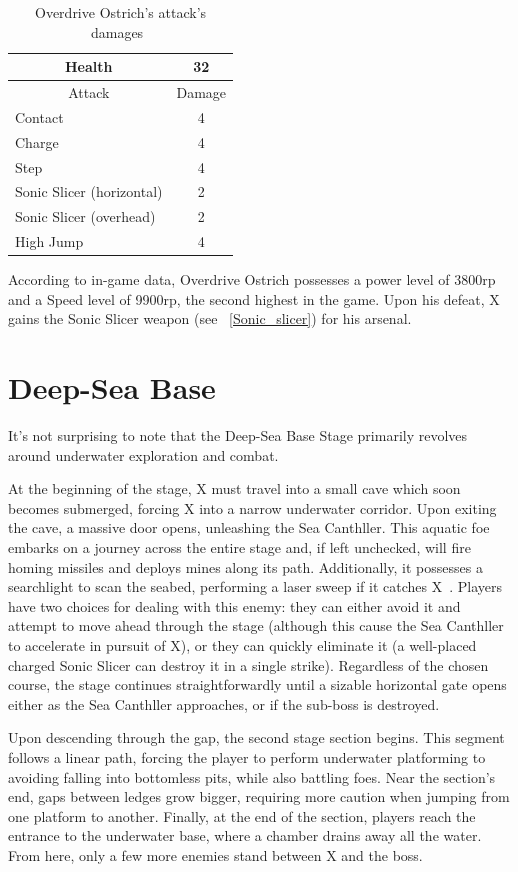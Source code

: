 \begin{table}[htp]
	\centering
	\begin{tabular}[h]{l c}
		\toprule
		\multicolumn{1}{c}{Health}  & 32 \\
		\midrule
		\multicolumn{1}{c}{Attack} & \multicolumn{1}{c}{Damage}\\
		Contact & 4 \\
		Charge & 4\\
		Step& 4\\
		Sonic Slicer (horizontal) & 2\\
		Sonic Slicer (overhead) & 2\\
		High Jump & 4\\
		\bottomrule
	\end{tabular}
	\caption{Overdrive Ostrich's attack's damages~\cite{wiki:Overdrive_Ostrich,book:Compendium}}
\end{table}
According to in-game data, Overdrive Ostrich possesses a power level of 3800rp and a Speed level of 9900rp, the second highest in the game. Upon his defeat, X gains the Sonic Slicer weapon (see ~\ref{Sonic_slicer}) for his arsenal.

\section{Deep-Sea Base}
It's not surprising to note that the Deep-Sea Base Stage primarily revolves around underwater exploration and combat.

At the beginning of the stage, X must travel into a small cave which soon becomes submerged, forcing X into a narrow underwater corridor. Upon exiting the cave, a massive door opens, unleashing the Sea Canthller. This aquatic foe embarks on a journey across the entire stage and, if left unchecked, will fire homing missiles and deploys mines along its path. Additionally, it possesses a searchlight to scan the seabed, performing a laser sweep if it catches X~\cite{wiki:Sea_Canthller}. Players have two choices for dealing with this enemy: they can either avoid it and attempt to move ahead through the stage (although this cause the Sea Canthller to accelerate in pursuit of X), or they can quickly eliminate it (a well-placed charged Sonic Slicer can destroy it in a single strike). Regardless of the chosen course, the stage continues straightforwardly until a sizable horizontal gate opens either as the Sea Canthller approaches, or if the sub-boss is destroyed.

Upon descending through the gap, the second stage section begins. This segment follows a linear path, forcing the player to perform underwater platforming to avoiding falling into bottomless pits, while also battling foes. Near the section's end, gaps between ledges grow bigger, requiring  more caution when jumping from one platform to another. Finally, at the end of the section, players reach the entrance to the underwater base, where a chamber drains away all the water. From here, only a few more enemies stand between X and the boss.

